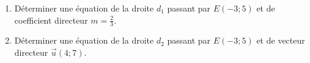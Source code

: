
\begin{enumerate}
\item Déterminer une équation de la droite $d_1$ passant par $E(-3;5)$ et de coefficient directeur $m=\frac{2}{3}$.
\item Déterminer une équation de la droite $d_2$ passant par $E(-3;5)$ et de vecteur directeur $\vec{u}(4;7)$.
\end{enumerate}